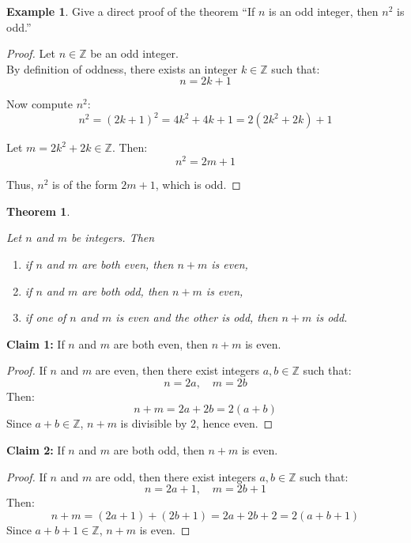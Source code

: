 \documentclass[
]{book}
\providecommand{\tightlist}{%
  \setlength{\itemsep}{0pt}\setlength{\parskip}{0pt}}
\newtheorem{theorem}{Theorem}[chapter]
\theoremstyle{definition}
\theoremstyle{definition}
\newtheorem{example}{Example}[chapter]
\theoremstyle{definition}
\theoremstyle{definition}
\theoremstyle{remark}
\begin{document}
\begin{example}
\protect\hypertarget{exm:unnamed-chunk-67}{}\label{exm:unnamed-chunk-67}Give a direct proof of the theorem ``If \(n\) is an odd integer, then \(n^2\) is odd.''
\end{example}

\begin{proof}
Let \(n \in \mathbb{Z}\) be an odd integer.\\
By definition of oddness, there exists an integer \(k \in \mathbb{Z}\) such that:
\[
n = 2k + 1
\]

Now compute \(n^2\):
\[
n^2 = (2k + 1)^2 = 4k^2 + 4k + 1 = 2(2k^2 + 2k) + 1
\]

Let \(m = 2k^2 + 2k \in \mathbb{Z}\). Then:
\[
n^2 = 2m + 1
\]

Thus, \(n^2\) is of the form \(2m + 1\), which is odd.
\end{proof}

\begin{theorem}
\protect\hypertarget{thm:unnamed-chunk-69}{}\label{thm:unnamed-chunk-69}

Let \(n\) and \(m\) be integers. Then

\begin{enumerate}
\def\labelenumi{\roman{enumi}.}
\tightlist
\item
  if \(n\) and \(m\) are both even, then \(n + m\) is even,
\item
  if \(n\) and \(m\) are both odd, then \(n + m\) is even,
\item
  if one of \(n\) and \(m\) is even and the other is odd, then \(n + m\) is odd.
\end{enumerate}

\end{theorem}

\textbf{Claim 1:} If \(n\) and \(m\) are both even, then \(n + m\) is even.

\begin{proof}
If \(n\) and \(m\) are even, then there exist integers \(a, b \in \mathbb{Z}\) such that:
\[
n = 2a,\quad m = 2b
\]
Then:
\[
n + m = 2a + 2b = 2(a + b)
\]
Since \(a + b \in \mathbb{Z}\), \(n + m\) is divisible by 2, hence even.
\end{proof}

\textbf{Claim 2:} If \(n\) and \(m\) are both odd, then \(n + m\) is even.

\begin{proof}
If \(n\) and \(m\) are odd, then there exist integers \(a, b \in \mathbb{Z}\) such that:
\[
n = 2a + 1,\quad m = 2b + 1
\]
Then:
\[
n + m = (2a + 1) + (2b + 1) = 2a + 2b + 2 = 2(a + b + 1)
\]
Since \(a + b + 1 \in \mathbb{Z}\), \(n + m\) is even.
\end{proof}
\end{document}
